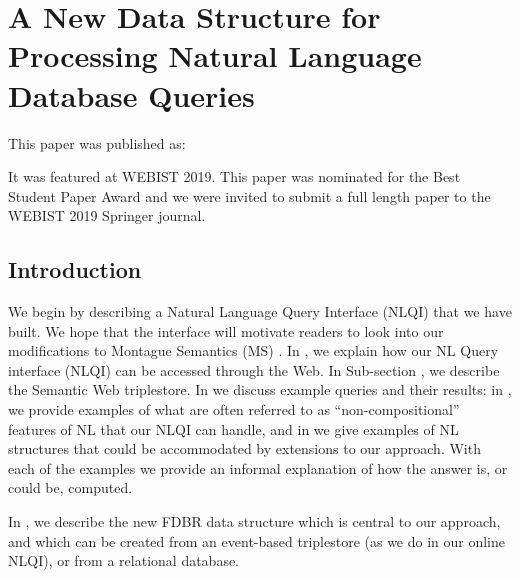 \documentclass[../main.tex]{subfiles}
\begin{document}
\chapter{A New Data Structure for Processing Natural Language Database Queries}
\begin{refsection}

This paper was published as:


It was featured at WEBIST 2019.  This paper was nominated for the Best Student Paper Award and we were invited to submit a full length paper to the WEBIST 2019 Springer journal.

\label{chapter:webist2019conf}


\section{Introduction}
We begin by describing a Natural Language Query Interface (NLQI) that we have built. We hope that the interface will motivate readers to look into our modifications to Montague Semantics (MS) \cite{Dowty:wall}. In , we explain how our NL Query  interface (NLQI) can be accessed through the Web. In Sub-section , we describe the Semantic Web triplestore. In  we discuss example queries and their results: in , we provide  examples of what are often referred to as ``non-compositional'' features of NL  that our NLQI can handle, and in  we give  examples of NL structures that could be accommodated by extensions to our approach. With each of the examples we provide an informal explanation of how the answer is, or could be, computed.

In , we describe the new FDBR data structure which is central to our approach, and which can be created from an event-based triplestore (as we do in our online NLQI), or from a relational database.


\end{refsection}
\end{document}
